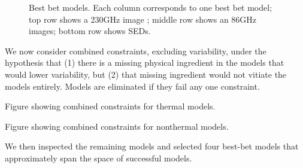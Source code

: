 \begin{figure}
    \centering
    \caption{Best bet models.  Each column corresponds to one best bet model; top row shows a 230GHz image ; middle row shows an 86GHz images; bottom row shows SEDs.}
    \label{fig:my_label}
\end{figure}


We now consider combined constraints, excluding variability, under the hypothesis that (1) there is a missing physical ingredient in the models that would lower variability, but (2) that missing ingredient would not vitiate the models entirely.  Models are eliminated if they fail any one constraint.

Figure showing combined constraints for thermal models.

Figure showing combined constraints for nonthermal models.

We then inspected the remaining models and selected four best-bet models that approximately span the space of successful models.  
